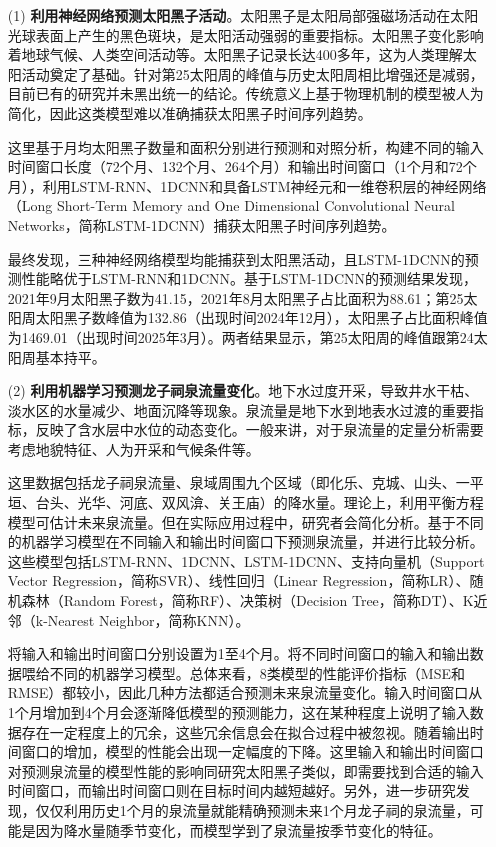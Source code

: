 \begin{enumerate}

  \item[(1)] \textbf{利用神经网络预测太阳黑子活动}。太阳黑子是太阳局部强磁场活动在太阳光球表面上产生的黑色斑块，是太阳活动强弱的重要指标。太阳黑子变化影响着地球气候、人类空间活动等。太阳黑子记录长达400多年，这为人类理解太阳活动奠定了基础。针对第25太阳周的峰值与历史太阳周相比增强还是减弱，目前已有的研究并未黑出统一的结论。传统意义上基于物理机制的模型被人为简化，因此这类模型难以准确捕获太阳黑子时间序列趋势。
  
  这里基于月均太阳黑子数量和面积分别进行预测和对照分析，构建不同的输入时间窗口长度（72个月、132个月、264个月）和输出时间窗口（1个月和72个月），利用LSTM-RNN、1DCNN和具备LSTM神经元和一维卷积层的神经网络（Long Short-Term Memory and One Dimensional Convolutional Neural Networks，简称LSTM-1DCNN）捕获太阳黑子时间序列趋势。
  
  最终发现，三种神经网络模型均能捕获到太阳黑活动，且LSTM-1DCNN的预测性能略优于LSTM-RNN和1DCNN。基于LSTM-1DCNN的预测结果发现，2021年9月太阳黑子数为41.15，2021年8月太阳黑子占比面积为88.61；第25太阳周太阳黑子数峰值为132.86（出现时间2024年12月），太阳黑子占比面积峰值为1469.01（出现时间2025年3月）。两者结果显示，第25太阳周的峰值跟第24太阳周基本持平。

  \item[{(2)}] \textbf{利用机器学习预测龙子祠泉流量变化}。地下水过度开采，导致井水干枯、淡水区的水量减少、地面沉降等现象。泉流量是地下水到地表水过渡的重要指标，反映了含水层中水位的动态变化。一般来讲，对于泉流量的定量分析需要考虑地貌特征、人为开采和气候条件等。
  
  这里数据包括龙子祠泉流量、泉域周围九个区域（即化乐、克城、山头、一平垣、台头、光华、河底、双风渰、关王庙）的降水量。理论上，利用平衡方程模型可估计未来泉流量。但在实际应用过程中，研究者会简化分析。基于不同的机器学习模型在不同输入和输出时间窗口下预测泉流量，并进行比较分析。这些模型包括LSTM-RNN、1DCNN、LSTM-1DCNN、支持向量机（Support Vector Regression，简称SVR）、线性回归（Linear Regression，简称LR）、随机森林（Random Forest，简称RF）、决策树（Decision Tree，简称DT）、K近邻（k-Nearest Neighbor，简称KNN）。
  
  将输入和输出时间窗口分别设置为1至4个月。将不同时间窗口的输入和输出数据喂给不同的机器学习模型。总体来看，8类模型的性能评价指标（MSE和RMSE）都较小，因此几种方法都适合预测未来泉流量变化。输入时间窗口从1个月增加到4个月会逐渐降低模型的预测能力，这在某种程度上说明了输入数据存在一定程度上的冗余，这些冗余信息会在拟合过程中被忽视。随着输出时间窗口的增加，模型的性能会出现一定幅度的下降。这里输入和输出时间窗口对预测泉流量的模型性能的影响同研究太阳黑子类似，即需要找到合适的输入时间窗口，而输出时间窗口则在目标时间内越短越好。另外，进一步研究发现，仅仅利用历史1个月的泉流量就能精确预测未来1个月龙子祠的泉流量，可能是因为降水量随季节变化，而模型学到了泉流量按季节变化的特征。
  

\end{enumerate}
